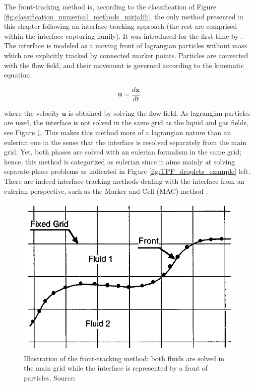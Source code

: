 The front-tracking method is, according to the classification of Figure \ref{fig:classification_numerical_methods_mirjalili}, the only method presented in this chapter following an interface-tracking approach (the rest are comprised within the interface-capturing family). It was introduced for the first time by . The interface is modeled as a moving front of lagrangian particles without mass which are explicitly tracked by connected marker points. Particles are convected with the flow field, and their movement is governed according to the kinematic equation:

\begin{equation}
\textbf{u} = \frac{d \textbf{x}}{d t}
\end{equation}

where the velocity $\textbf{u}$ is obtained by solving the flow field. As lagrangian particles are used, the interface is not solved in the same grid as the liquid and gas fields, see Figure \ref{fig:front_tracking_tryggvason}. This makes this method more of a lagrangian nature than an eulerian one in the sense that the interface is resolved separately from the main grid. Yet, both phases are solved with an eulerian formalism in the same grid; hence, this method is categorized as eulerian since it aims mainly at solving separate-phase problems as indicated in Figure \ref{fig:TPF_droplets_example} left. There are indeed interface-tracking methods dealing with the interface from an eulerian perspective, such as the Marker and Cell (MAC) method .

\begin{figure}[h!]
	\centering
	\includegraphics[scale=0.5]{./part1_numerical_approaches/figures_ch2/front-tracking_triggvason}
	\caption[Illustration of the front-tracking method]{Illustration of the front-tracking method: both fluids are solved in the main grid while the interface is represented by a front of particles. Source: }
	\label{fig:front_tracking_tryggvason}
\end{figure}




